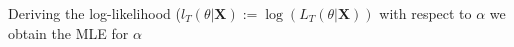 \documentclass[12pt, reqno]{amsart}
\newcommand{\1}{{\bf 1}}
\newcommand{\2}{{\bf 2}}
\theoremstyle{definition}
\theoremstyle{remark}
\numberwithin{equation}{section}
\begin{document}
Deriving the log-likelihood ($l_T(\theta|\bm X):=\log(L_T(\theta|\bm X))$ with respect to $\alpha$ we obtain the MLE for $\alpha$ 





\end{document}
